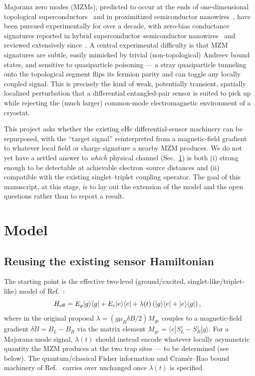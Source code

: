\documentclass[aps,pra,reprint,superscriptaddress,longbibliography]{revtex4-2}
\begin{document}
Majorana zero modes (MZMs), predicted to occur at the ends of one-dimensional topological
superconductors~\cite{kitaev2001unpaired} and in proximitized semiconductor
nanowires~\cite{lutchyn2010majorana,oreg2010helical}, have been pursued experimentally for over a
decade, with zero-bias conductance signatures reported in hybrid
superconductor--semiconductor nanowires~\cite{mourik2012signatures} and reviewed extensively
since~\cite{beenakker2013search,lutchyn2018majorana}. A central experimental difficulty is that MZM
signatures are subtle, easily mimicked by trivial (non-topological) Andreev bound states, and
sensitive to quasiparticle poisoning — a stray quasiparticle tunneling onto the topological segment
flips its fermion parity and can toggle any locally coupled signal. This is precisely the kind of
weak, potentially transient, spatially localized perturbation that a differential entangled-pair
sensor is suited to pick up while rejecting the (much larger) common-mode electromagnetic
environment of a cryostat.

This project asks whether the existing eHe differential-sensor machinery can be repurposed, with
the ``target signal'' reinterpreted from a magnetic-field gradient to whatever local field or charge
signature a nearby MZM produces. We do not yet have a settled answer to \emph{which} physical
channel (Sec.~\ref{sec:model}) is both (i) strong enough to be detectable at achievable electron--source
distances and (ii) compatible with the existing singlet--triplet coupling operator. The goal of this
manuscript, at this stage, is to lay out the extension of the model and the open questions rather
than to report a result.

\section{Model}
\label{sec:model}

\subsection{Reusing the existing sensor Hamiltonian}

The starting point is the effective two-level (ground/excited, singlet-like/triplet-like) model of
Ref.~\cite{perruzza2026}:
\begin{equation}
H_{\rm eff} = E_g|g\rangle\langle g| + E_e|e\rangle\langle e| +
\lambda(t)\left(|g\rangle\langle e| + |e\rangle\langle g|\right),
\end{equation}
where in the original proposal $\lambda = (g\mu_B \delta B/2) M_{ge}$ couples to a magnetic-field
gradient $\delta B = B_L - B_R$ via the matrix element $M_{ge} = \langle e|S^z_L - S^z_R|g\rangle$.
For a Majorana-mode signal, $\lambda(t)$ should instead encode whatever locally asymmetric quantity
the MZM produces at the two trap sites — to be determined (see below). The quantum/classical Fisher
information and Cram\'er--Rao bound machinery of Ref.~\cite{perruzza2026} carries over unchanged
once $\lambda(t)$ is specified.
\end{document}
